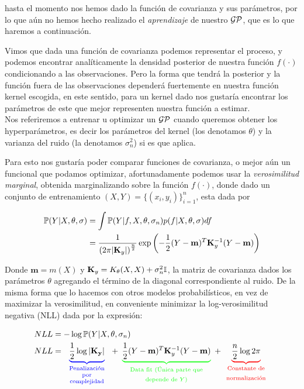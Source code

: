 hasta el momento nos hemos dado la función de covarianza y sus parámetros, por lo que aún no hemos hecho realizado el \textit{aprendizaje} de nuestro $\mathcal{GP}$, que es lo que haremos a continuación.\\


Vimos que dada una función de covarianza podemos representar el proceso, y podemos encontrar analíticamente la densidad posterior de nuestra función $f(\cdot)$ condicionando a las observaciones. Pero la forma que tendrá la posterior y la función fuera de las observaciones dependerá fuertemente en nuestra función kernel escogida, en este sentido, para un kernel dado nos gustaría encontrar los parámetros de este que mejor representen nuestra función a estimar.\\

Nos referiremos a entrenar u optimizar un $\mathcal{GP}$ cuando queremos obtener los hyperparámetros, es decir los parámetros del kernel (los denotamos $\theta$) y la varianza del ruido (la denotamos $\sigma_n^2$) si es que aplica.

Para esto nos gustaría poder comparar funciones de covarianza, o mejor aún un funcional que podamos optimizar, afortunadamente podemos usar la \textit{verosimilitud marginal}, obtenida marginalizando sobre la función $f(\cdot)$, donde dado un conjunto de entrenamiento $(X, Y)= \{(x_i, y_i)\}_{i=1}^{n}$, esta dada por

\begin{align}
	\mathbb{P}(Y|X, \theta, \sigma) & = \int \mathbb{P}(Y|f, X, \theta, \sigma_n) p(f|X,\theta, \sigma) df \\
	& = \frac{1}{\left( 2\pi |\mathbf{K}_y|\right)^{\frac{n}{2}}} 
	\exp \left(
	-\frac{1}{2} (Y - \mathbf{m})^T \mathbf{K}_y^{-1} (Y - \mathbf{m})
	\right)
\end{align}

Donde $\mathbf{m}=m(X)$ y $\mathbf{K}_y=K_{\theta}(X,X) + \sigma_n^2 {\mathbb I}$, la matriz de covarianza dados los parámetros $\theta$ agregando el término de la diagonal correspondiente al ruido. De la misma forma que lo hacemos con otros modelos probabilísticos, en vez de maximizar la verosimilitud, en conveniente minimizar la log-verosimilitud negativa (NLL) dada por la expresión:

\begin{align}
	NLL & = -\log \pr(Y|X, \theta, \sigma_n) \\
	NLL & = \textcolor{blue}{\underbrace{ \color{black}{\frac{1}{2}\log|\mathbf{K_y}|} }_
	    {\text{\parbox{2cm}{\centering Penalización\\[-4pt] por\\[-4pt] complejidad}}}}
	    + \textcolor{Green}{\underbrace{ \color{black}{\frac{1}{2}(Y - \mathbf{m})^T \mathbf{K}_y^{-1} (Y - \mathbf{m}) }}_
	    {\text{\parbox{4cm}{\centering Data fit (Única parte que depende de $Y$)}}}}
	    + \textcolor{red}{\underbrace{ \color{black}{\frac{n}{2} \log2\pi}}_
	    {\text{\parbox{2cm}{\centering Constante de normalización}}}} \label{eq:gp_nll}
\end{align}

